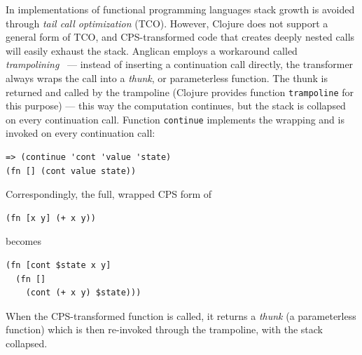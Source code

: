 \documentclass[preprint]{sigplanconf}
\begin{document}
\iftoggle{full}{
Continuations are functions that are called in tail positions
with the computed value and state as their arguments --- in CPS
there is always a function call in every tail position and never
a value. Continuations are passed to CPS transformers, and when
transformers are called recursively, the continuations are
generated on the fly.

There are two critical issues related to generation of
continuations:
\begin{itemize}
    \item unbounded \textit{stack growth} in recursive code;
    \item code size \textit{explosion} when a non-atomic
        continuation is symbolically substituted in multiple
        locations.
\end{itemize}

\paragraph{Managing stack size}
}{%
Continuations may lead to unbounded stack growth in
recursive code.
}%
In implementations of functional programming languages stack
growth is avoided through \textit{tail call optimization} (TCO).
However, Clojure does not support a general form of TCO, and
CPS-transformed code that creates deeply nested calls will
easily exhaust the stack. Anglican employs a workaround called
\textit{trampolining}~\cite{B95} --- instead of inserting a
continuation call directly, the transformer always wraps the
call into a \textit{thunk}, or parameterless function. The thunk
is returned and called by the trampoline (Clojure provides
function \texttt{trampoline} for this purpose) --- this way the
computation continues, but the stack is collapsed on every
continuation call. Function \texttt{continue} implements the
wrapping and is invoked on every continuation call:
\begin{lstlisting}[style=default]
=> (continue 'cont 'value 'state)
(fn [] (cont value state))
\end{lstlisting}
Correspondingly, the full, wrapped CPS form of
\begin{lstlisting}[style=default]
(fn [x y] (+ x y))
\end{lstlisting}
becomes
\begin{lstlisting}[style=default]
(fn [cont $state x y]
  (fn []
    (cont (+ x y) $state)))
\end{lstlisting}
When the CPS-transformed function is called, it returns a
\textit{thunk} (a parameterless function) which is then
re-invoked through the trampoline, with the stack collapsed.
\end{document}
